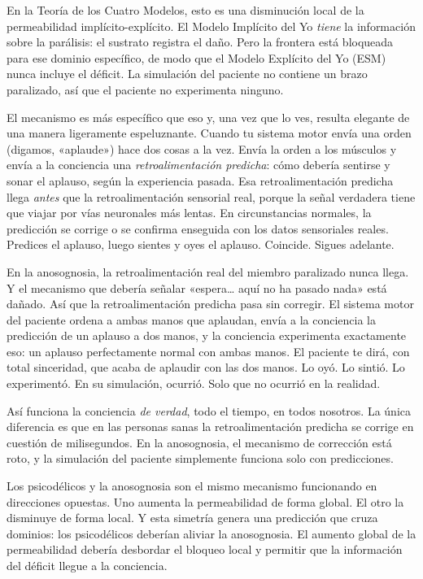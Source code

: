 \documentclass[11pt, twoside, openright]{book}
\begin{document}
En la Teoría de los Cuatro Modelos, esto es una disminución local de la permeabilidad implícito-explícito. El Modelo Implícito del Yo \textit{tiene} la información sobre la parálisis: el sustrato registra el daño. Pero la frontera está bloqueada para ese dominio específico, de modo que el Modelo Explícito del Yo (ESM) nunca incluye el déficit. La simulación del paciente no contiene un brazo paralizado, así que el paciente no experimenta ninguno.

El mecanismo es más específico que eso y, una vez que lo ves, resulta elegante de una manera ligeramente espeluznante. Cuando tu sistema motor envía una orden (digamos, «aplaude») hace dos cosas a la vez. Envía la orden a los músculos y envía a la conciencia una \textit{retroalimentación predicha}: cómo debería sentirse y sonar el aplauso, según la experiencia pasada. Esa retroalimentación predicha llega \textit{antes} que la retroalimentación sensorial real, porque la señal verdadera tiene que viajar por vías neuronales más lentas. En circunstancias normales, la predicción se corrige o se confirma enseguida con los datos sensoriales reales. Predices el aplauso, luego sientes y oyes el aplauso. Coincide. Sigues adelante.

En la anosognosia, la retroalimentación real del miembro paralizado nunca llega. Y el mecanismo que debería señalar «espera… aquí no ha pasado nada» está dañado. Así que la retroalimentación predicha pasa sin corregir. El sistema motor del paciente ordena a ambas manos que aplaudan, envía a la conciencia la predicción de un aplauso a dos manos, y la conciencia experimenta exactamente eso: un aplauso perfectamente normal con ambas manos. El paciente te dirá, con total sinceridad, que acaba de aplaudir con las dos manos. Lo oyó. Lo sintió. Lo experimentó. En su simulación, ocurrió. Solo que no ocurrió en la realidad.

Así funciona la conciencia \textit{de verdad}, todo el tiempo, en todos nosotros. La única diferencia es que en las personas sanas la retroalimentación predicha se corrige en cuestión de milisegundos. En la anosognosia, el mecanismo de corrección está roto, y la simulación del paciente simplemente funciona solo con predicciones.

Los psicodélicos y la anosognosia son el mismo mecanismo funcionando en direcciones opuestas. Uno aumenta la permeabilidad de forma global. El otro la disminuye de forma local. Y esta simetría genera una predicción que cruza dominios: los psicodélicos deberían aliviar la anosognosia. El aumento global de la permeabilidad debería desbordar el bloqueo local y permitir que la información del déficit llegue a la conciencia.
\end{document}
